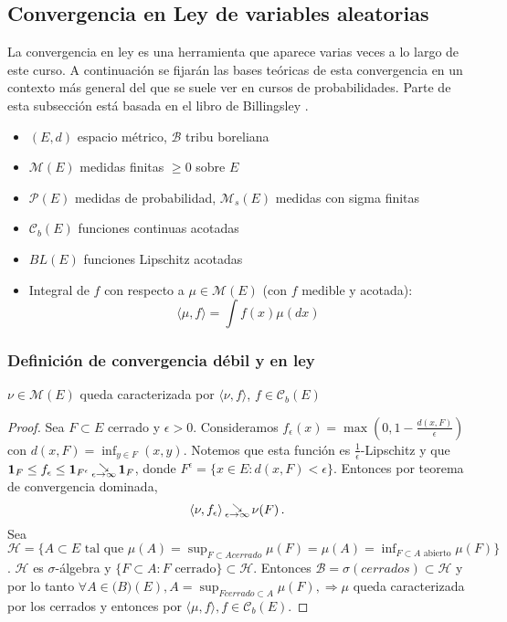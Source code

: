 \subsection{Convergencia en Ley de variables aleatorias}
La convergencia en ley es una herramienta que aparece varias veces a lo largo de este curso. A continuación se fijarán las bases teóricas de esta convergencia en un contexto más general del que se suele ver en cursos de probabilidades.
Parte de esta subsección está basada en el libro de Billingsley \cite{billing}.
\begin{notation}
\beforeitemize
\begin{itemize}
    \item $(E,d)$ espacio métrico, $\mathcal{B}$ tribu boreliana
    \item $\mathcal{M}(E)$ medidas finitas $\geq0$ sobre $E$
    \item $\mathcal{P}(E)$ medidas de probabilidad, $\mathcal{M}_s(E)$ medidas con sigma finitas %
    \item $\mathcal{C}_b(E)$ funciones continuas acotadas %
    \item $BL(E)$ funciones Lipschitz acotadas
    \item Integral de $f$ con respecto a $\mu \in \mathcal{M}(E)$ (con $f$ medible y acotada): $$ \langle \mu, f \rangle = \int f(x)\mu(dx) $$
\end{itemize}
\end{notation}

\subsubsection{Definición de convergencia débil y en ley}
\begin{remark}
$\nu \in \mathcal{M}(E)$ queda caracterizada por $\langle \nu,f \rangle$, $f \in \mathcal{C}_b(E)$
\end{remark}
\begin{proof}\gris Sea $F\subset E$ cerrado y $\epsilon>0$. Consideramos $f_\epsilon(x) = \max (0,1-\frac{d(x,F)}{\epsilon})$ con $d(x,F)=\displaystyle\inf_{y\in F}(x,y)$. Notemos que esta función es $\frac{1}{\epsilon}$-Lipschitz y que $\mathbf{1}_F\leq f_\epsilon\leq\mathbf{1}_{F^\epsilon}\,\substack{\searrow \\ \tiny{\epsilon\to\infty}}\,\mathbf{1}_F$, donde $F^\epsilon = \{x \in E : d(x,F)<\epsilon\}$. Entonces por teorema de convergencia dominada, 
$$ \langle \nu,f_\epsilon \rangle \,\substack{\searrow \\ \tiny{\epsilon\to\infty}}\, \nu(F) \, . $$
Sea $\displaystyle\mathcal{H}=\{A\subset E \mbox{ tal que }\mu(A)=\sup_{F\subset A cerrado}\mu(F)=\mu(A)=\inf_{F\subset A\mbox{ abierto}}\mu(F)\}$. $\mathcal{H}$ es $\sigma$-álgebra y $\{F\subset A : F\mbox{ cerrado}\}\subset\mathcal{H}$. Entonces $\mathcal{B}=\sigma(cerrados)\subset\mathcal{H}$ y por lo tanto $\displaystyle\forall A\in\mathcal(B)(E),A=\sup_{F cerrado \subset A}\mu(F),\Rightarrow \mu$ queda caracterizada por los cerrados y entonces por $\langle \mu,f \rangle, f\in\mathcal{C}_b(E)$. 
\negro \findem
\end{proof}

